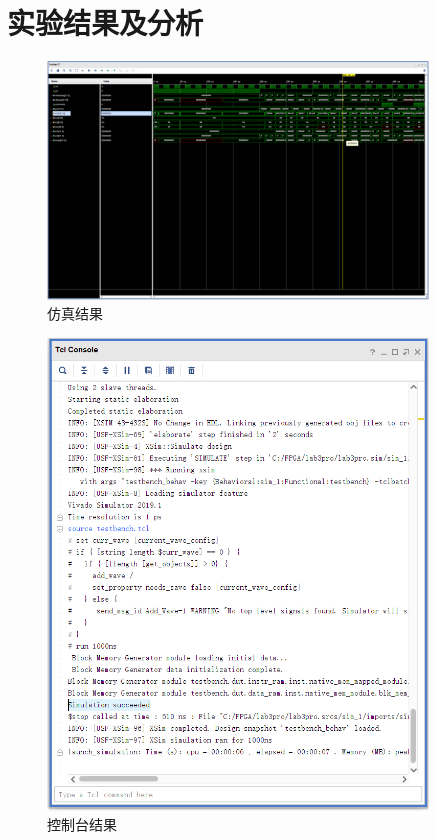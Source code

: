 \section{实验结果及分析}
\begin{figure}[H]
    \centering
    \includegraphics[width=0.9\textwidth]{image/sim.png}
    \caption{仿真结果}
    \label{fig:tcl}
\end{figure}
\begin{figure}[H]
    \centering
    \includegraphics[width=0.9\textwidth]{image/simsuccess.png}
    \caption{控制台结果}
    \label{fig:sim}
\end{figure}